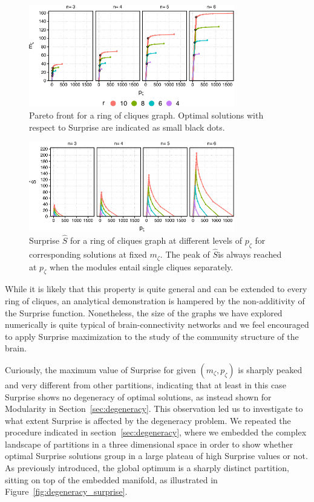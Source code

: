 \begin{figure}[htb!]
\centering
\includegraphics[width=0.8\textwidth]{images/ring_cliques_pareto.pdf}
\caption{Pareto front for a ring of cliques graph. Optimal solutions with respect to Surprise are indicated as small black dots.}
\label{fig:ring_cliques_pareto}
\end{figure}

\begin{figure}[htb!]
\centering
\includegraphics[width=0.8\textwidth]{images/ring_cliques_surprise.pdf}
\caption{Surprise $\hat{S}$ for a ring of cliques graph at different levels of $p_\zeta$ for corresponding solutions at fixed $m_\zeta$. The peak of $\hat{S} $is always reached at $p_\zeta$ when the modules entail single cliques separately.}
\label{fig:ring_cliques_surprise}
\end{figure}

While it is likely that this property is quite general and can be extended to every ring of cliques, an analytical demonstration is hampered by the non-additivity of the Surprise function.
Nonetheless, the size of the graphs we have explored numerically is quite typical of brain-connectivity networks and we feel encouraged to apply Surprise maximization to the study of the community structure of the brain.

Curiously, the maximum value of Surprise for given $(m_\zeta,p_\zeta)$ is sharply peaked and very different from other partitions, indicating that at least in this case Surprise shows no degeneracy of optimal solutions, as instead shown for Modularity in Section~\ref{sec:degeneracy}.
This observation led us to investigate to what extent Surprise is affected by the degeneracy problem.
We repeated the procedure indicated in section~\ref{sec:degeneracy}, where we embedded the complex landscape of partitions in a three dimensional space in order to show whether optimal Surprise solutions group in a large plateau of high Surprise values or not. As previously introduced, the global optimum is a sharply distinct partition, sitting on top of the embedded manifold, as illustrated in Figure~\ref{fig:degeneracy_surprise}.

